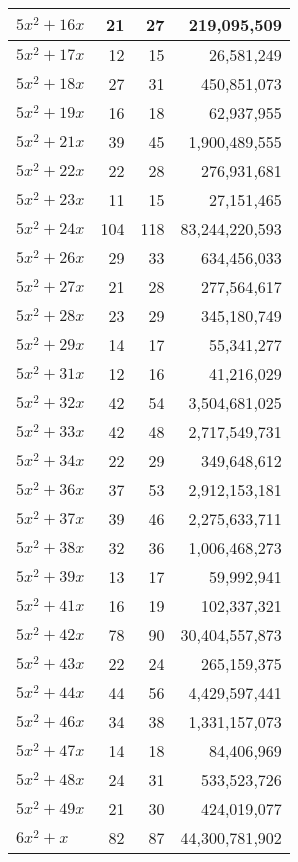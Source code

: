\documentclass[a4paper]{amsproc}
\theoremstyle{plain}
\begin{document}
\begin{longtable}{ | l | r | r | r | }
$5x^2 + 16x$ & 21 & 27 & 219{,}095{,}509 \\ \hline
$5x^2 + 17x$ & 12 & 15 & 26{,}581{,}249 \\ \hline
$5x^2 + 18x$ & 27 & 31 & 450{,}851{,}073 \\ \hline
$5x^2 + 19x$ & 16 & 18 & 62{,}937{,}955 \\ \hline
$5x^2 + 21x$ & 39 & 45 & 1{,}900{,}489{,}555 \\ \hline
$5x^2 + 22x$ & 22 & 28 & 276{,}931{,}681 \\ \hline
$5x^2 + 23x$ & 11 & 15 & 27{,}151{,}465 \\ \hline
$5x^2 + 24x$ & 104 & 118 & 83{,}244{,}220{,}593 \\ \hline
$5x^2 + 26x$ & 29 & 33 & 634{,}456{,}033 \\ \hline
$5x^2 + 27x$ & 21 & 28 & 277{,}564{,}617 \\ \hline
$5x^2 + 28x$ & 23 & 29 & 345{,}180{,}749 \\ \hline
$5x^2 + 29x$ & 14 & 17 & 55{,}341{,}277 \\ \hline
$5x^2 + 31x$ & 12 & 16 & 41{,}216{,}029 \\ \hline
$5x^2 + 32x$ & 42 & 54 & 3{,}504{,}681{,}025 \\ \hline
$5x^2 + 33x$ & 42 & 48 & 2{,}717{,}549{,}731 \\ \hline
$5x^2 + 34x$ & 22 & 29 & 349{,}648{,}612 \\ \hline
$5x^2 + 36x$ & 37 & 53 & 2{,}912{,}153{,}181 \\ \hline
$5x^2 + 37x$ & 39 & 46 & 2{,}275{,}633{,}711 \\ \hline
$5x^2 + 38x$ & 32 & 36 & 1{,}006{,}468{,}273 \\ \hline
$5x^2 + 39x$ & 13 & 17 & 59{,}992{,}941 \\ \hline
$5x^2 + 41x$ & 16 & 19 & 102{,}337{,}321 \\ \hline
$5x^2 + 42x$ & 78 & 90 & 30{,}404{,}557{,}873 \\ \hline
$5x^2 + 43x$ & 22 & 24 & 265{,}159{,}375 \\ \hline
$5x^2 + 44x$ & 44 & 56 & 4{,}429{,}597{,}441 \\ \hline
$5x^2 + 46x$ & 34 & 38 & 1{,}331{,}157{,}073 \\ \hline
$5x^2 + 47x$ & 14 & 18 & 84{,}406{,}969 \\ \hline
$5x^2 + 48x$ & 24 & 31 & 533{,}523{,}726 \\ \hline
$5x^2 + 49x$ & 21 & 30 & 424{,}019{,}077 \\ \hline
$6x^2 + x$ & 82 & 87 & 44{,}300{,}781{,}902 \\ \hline

\end{longtable}
\end{document}
